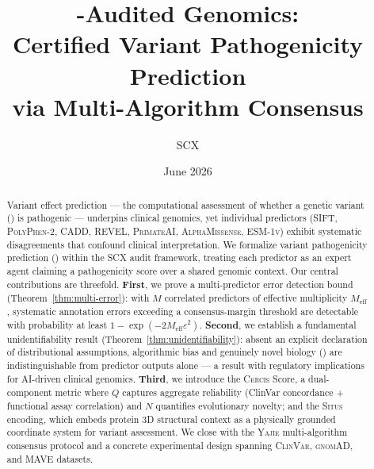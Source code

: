 \documentclass[11pt,a4paper]{article}
\title{\textbf{\SCX-Audited Genomics:} \\
       \large Certified Variant Pathogenicity Prediction \\
       via Multi-Algorithm Consensus}
\author{SCX}
\date{June 2026}
\theoremstyle{definition}
\newcommand{\SCX}{\textsc{SCX}}
\newcommand{\situs}{\textsc{Situs}}
\newcommand{\cercis}{\textsc{Cercis}}
\newcommand{\yajie}{\textsc{Yajie}}
\newcommand{\ClinVar}{\textsc{ClinVar}}
\newcommand{\gnomAD}{\textsc{gnomAD}}
\newcommand{\MAVE}{\textsc{MAVE}}
\newcommand{\SIFT}{\textsc{SIFT}}
\newcommand{\PolyPhen}{\textsc{PolyPhen-2}}
\newcommand{\CADD}{\textsc{CADD}}
\newcommand{\REVEL}{\textsc{REVEL}}
\newcommand{\PrimateAI}{\textsc{PrimateAI}}
\newcommand{\AlphaMissense}{\textsc{AlphaMissense}}
\newcommand{\ESM}{\textsc{ESM-1v}}
\newcommand{\genome}{}
\newcommand{\pathovar}{}
\newcommand{\novelbio}{}
\begin{document}
\maketitle
\begin{abstract}
\noindent
Variant effect prediction — the computational assessment of whether a genetic variant (\genome{}) is pathogenic — underpins clinical genomics, yet individual predictors (\SIFT, \PolyPhen, \CADD, \REVEL, \PrimateAI, \AlphaMissense, \ESM) exhibit systematic disagreements that confound clinical interpretation.
We formalize variant pathogenicity prediction (\pathovar{}) within the \SCX{} audit framework, treating each predictor as an expert agent claiming a pathogenicity score over a shared genomic context.
Our central contributions are threefold.
\textbf{First}, we prove a multi-predictor error detection bound (Theorem~\ref{thm:multi-error}): with $M$ correlated predictors of effective multiplicity $M_{\text{eff}}$, systematic annotation errors exceeding a consensus-margin threshold are detectable with probability at least $1 - \exp(-2M_{\text{eff}}\varepsilon^2)$.
\textbf{Second}, we establish a fundamental unidentifiability result (Theorem~\ref{thm:unidentifiability}): absent an explicit declaration of distributional assumptions, algorithmic bias and genuinely novel biology (\novelbio{}) are indistinguishable from predictor outputs alone — a result with regulatory implications for AI-driven clinical genomics.
\textbf{Third}, we introduce the \cercis{} Score, a dual-component metric where $Q$ captures aggregate reliability (ClinVar concordance + functional assay correlation) and $N$ quantifies evolutionary novelty; and the \situs{} encoding, which embeds protein 3D structural context as a physically grounded coordinate system for variant assessment.
We close with the \yajie{} multi-algorithm consensus protocol and a concrete experimental design spanning \ClinVar, \gnomAD, and \MAVE{} datasets.
\end{abstract}
\tableofcontents
\newpage
\end{document}
